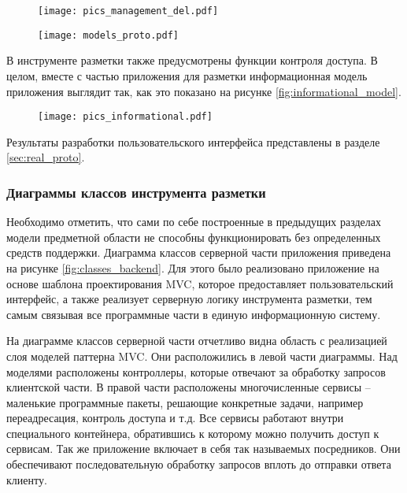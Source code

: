 \documentclass[../main]{subfiles}
\begin{document}
\begin{figure}[H]
    \centering
    {\texttt{[image: pics\_management\_del.pdf]}}
    \vspace{-\baselineskip}
\end{figure}

\begin{figure}[H]
    \centering
    {\texttt{[image: models\_proto.pdf]}}
    \vspace{-\baselineskip}
\end{figure}

В инструменте разметки также предусмотрены функции контроля доступа. В целом, вместе с частью приложения для разметки информационная модель приложения выглядит так, как это показано на рисунке \ref{fig:informational_model}.

\begin{figure}[H]
    \centering
    {\texttt{[image: pics\_informational.pdf]}}
    \vspace{-\baselineskip}
\end{figure}

Результаты разработки пользовательского интерфейса представлены в разделе \ref{sec:real_proto}.

\subsubsection{Диаграммы классов инструмента разметки}

Необходимо отметить, что сами по себе построенные в предыдущих разделах модели предметной области не способны функционировать без определенных средств поддержки. Диаграмма классов серверной части приложения приведена на рисунке \ref{fig:classes_backend}. Для этого было реализовано приложение на основе шаблона проектирования MVC, которое предоставляет пользовательский интерфейс, а также реализует серверную логику инструмента разметки, тем самым связывая все программные части в единую информационную систему.  

На диаграмме классов серверной части отчетливо видна область с реализацией слоя моделей паттерна MVC. Они расположились в левой части диаграммы. Над моделями расположены контроллеры, которые отвечают за обработку запросов клиентской части. В правой части расположены многочисленные сервисы -- маленькие программные пакеты, решающие конкретные задачи, например переадресация, контроль доступа и т.д. Все сервисы работают внутри специального контейнера, обратившись к которому можно получить доступ к сервисам. Так же приложение включает в себя так называемых посредников. Они обеспечивают последовательную обработку запросов вплоть до отправки ответа клиенту.
\end{document}
